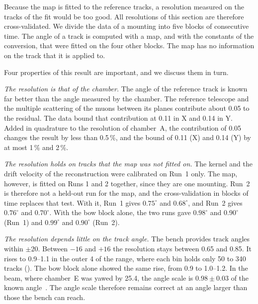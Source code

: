 Because the map is fitted to the reference tracks, a resolution measured on the tracks of the fit would be too good.
All resolutions of this section are therefore cross-validated. We divide the data of a mounting into five blocks of
consecutive time. The angle of a track is computed with a map, and with the constants of the conversion, that were
fitted on the four other blocks. The map has no information on the track that it is applied to.

Four properties of this result are important, and we discuss them in turn.

\emph{The resolution is that of the chamber.} The angle of the reference track is known far better than the angle
measured by the chamber. The reference telescope and the multiple scattering of the muons between its planes
contribute about 0.05\textdegree{} to the residual. The data bound that contribution at 0.11\textdegree{} in X and
0.14\textdegree{} in Y. Added in quadrature to the resolution of chamber~A, the contribution of 0.05\textdegree{} changes the result by less
than 0.5\,\%, and the bound of 0.11\textdegree{} (X) and 0.14\textdegree{} (Y) by at most 1\,\% and 2\,\%.

\emph{The resolution holds on tracks that the map was not fitted on.} The kernel and the drift velocity of the
reconstruction were calibrated on Run~1 only. The map, however, is fitted on Runs 1 and 2 together, since they are
one mounting. Run~2 is therefore not a held-out run for the map, and the cross-validation in blocks of time replaces
that test. With it, Run~1 gives $0.75^\circ$ and $0.68^\circ$, and Run~2 gives $0.76^\circ$ and $0.70^\circ$. With
the bow block alone, the two runs gave $0.98^\circ$ and $0.90^\circ$ (Run~1) and $0.99^\circ$ and $0.90^\circ$
(Run~2).

\emph{The resolution depends little on the track angle.} The bench provides track angles within $\pm20$\textdegree.
Between $-16$ and $+16$\textdegree{} the resolution stays between 0.65 and 0.85\textdegree{}. It rises to 0.9--1.1\textdegree{}
in the outer 4\textdegree{} of the range, where each bin holds only 50 to 340 tracks (). The bow block alone showed the same rise, from 0.9 to 1.0--1.2\textdegree. In the beam,
where chamber~E was yawed by 25.4\textdegree{}, the angle scale is $0.98\pm0.03$ of the known angle~\cite{paperII}.
The angle scale therefore remains correct at an angle larger than those the bench can reach.

